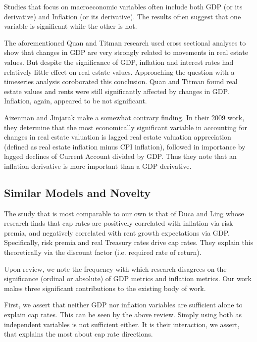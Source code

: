 Studies that focus on macroeconomic variables often include both GDP (or its derivative) and Inflation (or its derivative). The results often suggest that one variable is significant while the other is not. 

The aforementioned Quan and Titman research used cross sectional analyses to show that changes in GDP are very strongly related to movements in real estate values. But despite the significance of GDP, inflation and interest rates had relatively little effect on real estate values. Approaching the question with a timeseries analysis coroborated this conclusion. Quan and Titman found real estate values and rents were still significantly affected by changes in GDP. Inflation, again, appeared to be not significant. 

Aizenman and Jinjarak make a somewhat contrary finding. In their 2009 work, \citep*{aizenman2009current} they determine that the most economically significant variable in accounting for changes in real estate valuation is lagged real estate valuation appreciation (defined as real estate inflation minus CPI inflation), followed in importance by lagged declines of Current Account divided by GDP. Thus they note that an inflation derivative is more important than a GDP derivative. 

\subsection{Similar Models and Novelty}

The study that is most comparable to our own is that of Duca and Ling \citep*{duca2017taxes} whose research finds that cap rates are positively correlated with inflation via risk premia, and negatively correlated with rent growth expectations via GDP. Specifically, risk premia and real Treasury rates drive cap rates. They explain this theoretically via the discount factor (i.e. required rate of return).

Upon review, we note the frequency with which research disagrees on the significance (ordinal or absolute) of GDP metrics and inflation metrics. Our work makes three significant contributions to the existing body of work. 

First, we assert that neither GDP nor inflation variables are sufficient alone to explain cap rates. This can be seen by the above review. Simply using both as independent variables is not sufficient either. It is their interaction, we assert, that explains the most about cap rate directions. 

